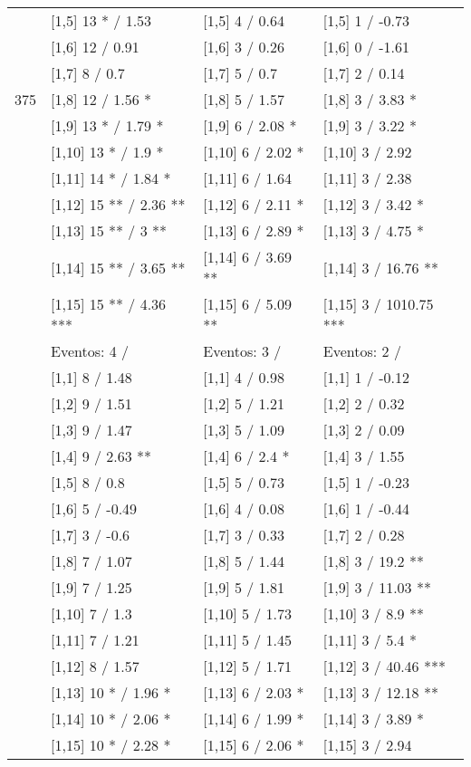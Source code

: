 \begin{table}
\begin{tabular}[t]{llll}
 & {}[1,5] 13 * / 1.53 & {}[1,5] 4  / 0.64 & {}[1,5] 1  / -0.73\\
 & {}[1,6] 12  / 0.91 & {}[1,6] 3  / 0.26 & {}[1,6] 0  / -1.61\\
 & {}[1,7] 8  / 0.7 & {}[1,7] 5  / 0.7 & {}[1,7] 2  / 0.14\\
375 & {}[1,8] 12  / 1.56 * & {}[1,8] 5  / 1.57 & {}[1,8] 3  / 3.83 *\\
\addlinespace
 & {}[1,9] 13 * / 1.79 * & {}[1,9] 6  / 2.08 * & {}[1,9] 3  / 3.22 *\\
 & {}[1,10] 13 * / 1.9 * & {}[1,10] 6  / 2.02 * & {}[1,10] 3  / 2.92\\
 & {}[1,11] 14 * / 1.84 * & {}[1,11] 6  / 1.64 & {}[1,11] 3  / 2.38\\
 & {}[1,12] 15 ** / 2.36 ** & {}[1,12] 6  / 2.11 * & {}[1,12] 3  / 3.42 *\\
 & {}[1,13] 15 ** / 3 ** & {}[1,13] 6  / 2.89 * & {}[1,13] 3  / 4.75 *\\
\addlinespace
 & {}[1,14] 15 ** / 3.65 ** & {}[1,14] 6  / 3.69 ** & {}[1,14] 3  / 16.76 **\\
 & {}[1,15] 15 ** / 4.36 *** & {}[1,15] 6  / 5.09 ** & {}[1,15] 3  / 1010.75 ***\\
 & Eventos:  4 / & Eventos:  3 / & Eventos:  2 /\\
 & {}[1,1] 8  / 1.48 & {}[1,1] 4  / 0.98 & {}[1,1] 1  / -0.12\\
 & {}[1,2] 9  / 1.51 & {}[1,2] 5  / 1.21 & {}[1,2] 2  / 0.32\\
\addlinespace
 & {}[1,3] 9  / 1.47 & {}[1,3] 5  / 1.09 & {}[1,3] 2  / 0.09\\
 & {}[1,4] 9  / 2.63 ** & {}[1,4] 6  / 2.4 * & {}[1,4] 3  / 1.55\\
 & {}[1,5] 8  / 0.8 & {}[1,5] 5  / 0.73 & {}[1,5] 1  / -0.23\\
 & {}[1,6] 5  / -0.49 & {}[1,6] 4  / 0.08 & {}[1,6] 1  / -0.44\\
 & {}[1,7] 3  / -0.6 & {}[1,7] 3  / 0.33 & {}[1,7] 2  / 0.28\\
\addlinespace
500 & {}[1,8] 7  / 1.07 & {}[1,8] 5  / 1.44 & {}[1,8] 3  / 19.2 **\\
 & {}[1,9] 7  / 1.25 & {}[1,9] 5  / 1.81 & {}[1,9] 3  / 11.03 **\\
 & {}[1,10] 7  / 1.3 & {}[1,10] 5  / 1.73 & {}[1,10] 3  / 8.9 **\\
 & {}[1,11] 7  / 1.21 & {}[1,11] 5  / 1.45 & {}[1,11] 3  / 5.4 *\\
 & {}[1,12] 8  / 1.57 & {}[1,12] 5  / 1.71 & {}[1,12] 3  / 40.46 ***\\
\addlinespace
 & {}[1,13] 10 * / 1.96 * & {}[1,13] 6  / 2.03 * & {}[1,13] 3  / 12.18 **\\
 & {}[1,14] 10 * / 2.06 * & {}[1,14] 6  / 1.99 * & {}[1,14] 3  / 3.89 *\\
 & {}[1,15] 10 * / 2.28 * & {}[1,15] 6  / 2.06 * & {}[1,15] 3  / 2.94\\
\bottomrule
\end{tabular}
\end{table}
